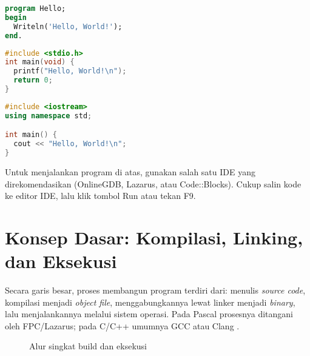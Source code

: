 \documentclass[../main.tex]{subfiles}
\begin{document}
\begin{lstlisting}[language=Pascal, caption={Hello World pada Pascal}]
program Hello;
begin
  Writeln('Hello, World!');
end.
\end{lstlisting}

\begin{lstlisting}[language=C, caption={Hello World pada C}]
#include <stdio.h>
int main(void) {
  printf("Hello, World!\n");
  return 0;
}
\end{lstlisting}

\begin{lstlisting}[language=C++, caption={Hello World pada C++}]
#include <iostream>
using namespace std;

int main() {
  cout << "Hello, World!\n";
}
\end{lstlisting}

Untuk menjalankan program di atas, gunakan salah satu IDE yang direkomendasikan (OnlineGDB, Lazarus, atau Code::Blocks). Cukup salin kode ke editor IDE, lalu klik tombol Run atau tekan F9.

\section{Konsep Dasar: Kompilasi, Linking, dan Eksekusi}
Secara garis besar, proses membangun program terdiri dari: menulis \emph{source code}, kompilasi menjadi \emph{object file}, menggabungkannya lewat linker menjadi \emph{binary}, lalu menjalankannya melalui sistem operasi. Pada Pascal prosesnya ditangani oleh FPC/Lazarus; pada C/C++ umumnya GCC atau Clang \parencite{free-pascal-docs,gnu-c-manual,cpp-reference}.

\begin{figure}[H]
  \centering
  \caption{Alur singkat build dan eksekusi}
  \label{fig:build-run-flow}
\end{figure}
\end{document}
